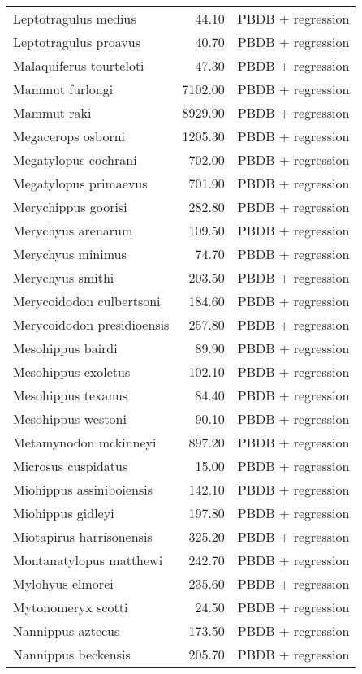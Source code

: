 \begin{table}[ht]
\begin{tabular}{lrl}
  Leptotragulus medius & 44.10 & PBDB + regression \\ 
  Leptotragulus proavus & 40.70 & PBDB + regression \\ 
  Malaquiferus tourteloti & 47.30 & PBDB + regression \\ 
  Mammut furlongi & 7102.00 & PBDB + regression \\ 
  Mammut raki & 8929.90 & PBDB + regression \\ 
  Megacerops osborni & 1205.30 & PBDB + regression \\ 
  Megatylopus cochrani & 702.00 & PBDB + regression \\ 
  Megatylopus primaevus & 701.90 & PBDB + regression \\ 
  Merychippus goorisi & 282.80 & PBDB + regression \\ 
  Merychyus arenarum & 109.50 & PBDB + regression \\ 
  Merychyus minimus & 74.70 & PBDB + regression \\ 
  Merychyus smithi & 203.50 & PBDB + regression \\ 
  Merycoidodon culbertsoni & 184.60 & PBDB + regression \\ 
  Merycoidodon presidioensis & 257.80 & PBDB + regression \\ 
  Mesohippus bairdi & 89.90 & PBDB + regression \\ 
  Mesohippus exoletus & 102.10 & PBDB + regression \\ 
  Mesohippus texanus & 84.40 & PBDB + regression \\ 
  Mesohippus westoni & 90.10 & PBDB + regression \\ 
  Metamynodon mckinneyi & 897.20 & PBDB + regression \\ 
  Microsus cuspidatus & 15.00 & PBDB + regression \\ 
  Miohippus assiniboiensis & 142.10 & PBDB + regression \\ 
  Miohippus gidleyi & 197.80 & PBDB + regression \\ 
  Miotapirus harrisonensis & 325.20 & PBDB + regression \\ 
  Montanatylopus matthewi & 242.70 & PBDB + regression \\ 
  Mylohyus elmorei & 235.60 & PBDB + regression \\ 
  Mytonomeryx scotti & 24.50 & PBDB + regression \\ 
  Nannippus aztecus & 173.50 & PBDB + regression \\ 
  Nannippus beckensis & 205.70 & PBDB + regression \\ 

\end{tabular}
\end{table}
